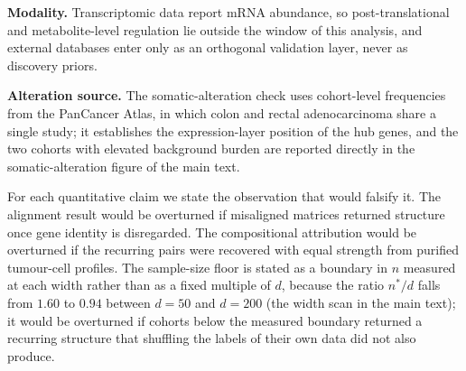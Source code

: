 \documentclass[11pt]{article}
\begin{document}
\textbf{Modality.} Transcriptomic data report mRNA abundance, so post-translational and metabolite-level regulation lie outside the window of this analysis, and external databases enter only as an orthogonal validation layer, never as discovery priors.

\textbf{Alteration source.} The somatic-alteration check uses cohort-level frequencies from the PanCancer Atlas, in which colon and rectal adenocarcinoma share a single study; it establishes the expression-layer position of the hub genes, and the two cohorts with elevated background burden are reported directly in the somatic-alteration figure of the main text.

For each quantitative claim we state the observation that would falsify it. The alignment result would be overturned if misaligned matrices returned structure once gene identity is disregarded. The compositional attribution would be overturned if the recurring pairs were recovered with equal strength from purified tumour-cell profiles. The sample-size floor is stated as a boundary in $n$ measured at each width rather than as a fixed multiple of $d$, because the ratio $n^{*}/d$ falls from $1.60$ to $0.94$ between $d = 50$ and $d = 200$ (the width scan in the main text); it would be overturned if cohorts below the measured boundary returned a recurring structure that shuffling the labels of their own data did not also produce.


\end{document}
